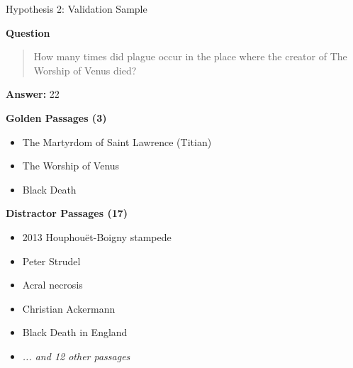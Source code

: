 \begin{frame}{Hypothesis 2: Validation Sample}

\textbf{Question}
\begin{quote}
How many times did plague occur in the place where the creator of The Worship of Venus died?
\end{quote}

\textbf{Answer:} 22

\vspace{0.2cm}

\textbf{Golden Passages (3)}
\begin{itemize}
    \item The Martyrdom of Saint Lawrence (Titian)
    \item The Worship of Venus
    \item Black Death
\end{itemize}

\textbf{Distractor Passages (17)}
\begin{itemize}
    \item 2013 Houphouët-Boigny stampede
    \item Peter Strudel
    \item Acral necrosis
    \item Christian Ackermann
    \item Black Death in England
    \item \textit{... and 12 other passages}
\end{itemize}

\end{frame}



